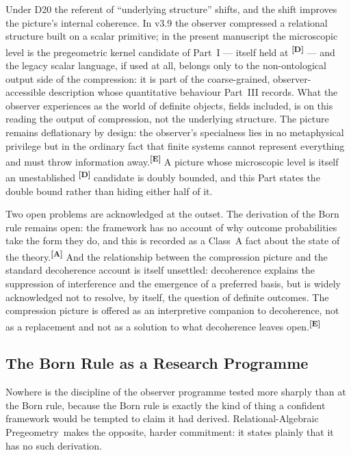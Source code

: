 \documentclass[12pt,a4paper,twoside]{article}
\theoremstyle{plain}
\theoremstyle{definition}
\theoremstyle{remark}
\newcommand{\ProjectShort}{Relational-Algebraic Pregeometry}
\newcommand{\RAP}{\ProjectShort}
\newcommand{\catmark}[1]{\textsuperscript{\textsf{\textbf{[#1]}}}}
\begin{document}
\noindent Under D20 the referent of ``underlying structure'' shifts, and
the shift improves the picture's internal coherence. In v3.9 the
observer compressed a relational structure built on a scalar primitive; in
the present manuscript the microscopic level is the pregeometric
kernel candidate of Part~I --- itself held at \catmark{D} --- and the
legacy scalar language, if used at all, belongs only to the non-ontological output side of
the compression: it is part of the coarse-grained, observer-accessible
description whose quantitative behaviour Part~III records. What the
observer experiences as the world of definite objects, fields included,
is on this reading the output of compression, not the underlying
structure. The picture remains deflationary by design: the observer's
specialness lies in no metaphysical privilege but in the ordinary fact
that finite systems cannot represent everything and must throw
information away.\catmark{E} A picture whose microscopic level is itself
an unestablished \catmark{D} candidate is doubly bounded, and this Part
states the double bound rather than hiding either half of it.

Two open problems are acknowledged at the outset. The derivation of the
Born rule remains open: the framework has no account of why outcome
probabilities take the form they do, and this is recorded as a Class~A
fact about the state of the theory.\catmark{A} And the relationship
between the compression picture and the standard decoherence account is
itself unsettled: decoherence explains the suppression of interference
and the emergence of a preferred basis, but is widely acknowledged not
to resolve, by itself, the question of definite outcomes. The
compression picture is offered as an interpretive companion to
decoherence, not as a replacement and not as a solution to what
decoherence leaves open.\catmark{E}

\subsection{The Born Rule as a Research Programme}
\label{subsec:born-rule}

Nowhere is the discipline of the observer programme tested more sharply
than at the Born rule, because the Born rule is exactly the kind of
thing a confident framework would be tempted to claim it had derived.
\RAP\ makes the opposite, harder commitment: it states plainly that it
has no such derivation.
\end{document}

